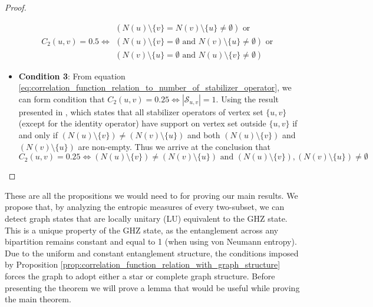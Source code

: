 \documentclass{article}
\begin{document}
\begin{proof}
\begin{itemize}
    $$C_2(u, v) = 0.5 \iff 
\begin{aligned}(N(u) \setminus \{v\} = N(v) \setminus \{u\} \neq \emptyset) \text{ or } \\
(N(u) \setminus \{v\} = \emptyset \text{ and } N(v) \setminus \{u\} \neq \emptyset) 
\text{ or } \\
(N(v) \setminus \{u\} = \emptyset \text{ and } N(u) \setminus \{v\} \neq \emptyset)
\end{aligned}$$

    
    \item \textbf{Condition 3}: From equation \ref{eq:correlation_function_relation_to_number_of_stabilizer_operator}, we can form condition that $C_2(u, v) = 0.25 \iff |\mathcal{S}_{u,v}| = 1$. Using the result presented in \cite{guhne2009entanglement}, which states that all stabilizer operators of vertex set $\{u, v\}$ (except for the identity operator) have support on vertex set outside $\{u, v\}$  if and only if $ (N(u) \setminus \{v\}) \neq (N(v) \setminus \{u\}) $ and both $ (N(u) \setminus \{v\}) $ and $ (N(v) \setminus \{u\}) $ are non-empty. Thus we arrive at the conclusion that 
    \begin{equation}
        C_2(u, v) = 0.25 \iff (N(u) \setminus \{v\}) \neq (N(v) \setminus \{u\}) \text{ and } (N(u) \setminus \{v\}), (N(v) \setminus \{u\}) \neq \emptyset
    \end{equation} 
\end{itemize}
\end{proof}

 These are all the propositions we would need to for proving our main results. We propose that, by analyzing the entropic measures of every two-subset, we can detect graph states that are locally unitary (LU) equivalent to the GHZ state. This is a unique property of the GHZ state, as the entanglement across any bipartition remains constant and equal to 1 (when using von Neumann entropy). Due to the uniform and constant entanglement structure, the conditions imposed by Proposition \ref{prop:correlation_function_relation_with_graph_structure} forces the graph to adopt either a star or complete graph structure. Before presenting the theorem we will prove a lemma that would be useful while proving the main theorem.
 
\end{document}
